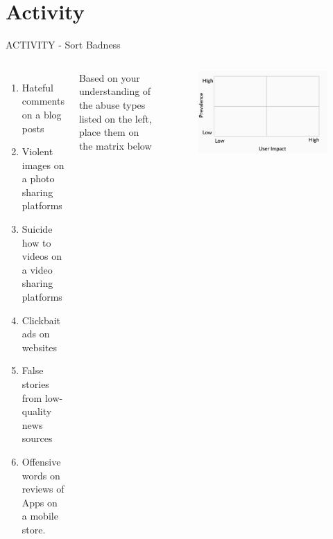 \documentclass[nobackground,dvipsnames,table,aspectratio=169]{beamer}
\begin{document}
\section{Activity}

\begin{frame}{ACTIVITY - Sort Badness}
    \begin{columns}[T]
            \begin{enumerate}
                \item Hateful comments on a blog posts
                \item Violent images on a photo sharing platforms \item Suicide how to videos on a video sharing platforms
                \item Clickbait ads on websites
                \item False stories from low-quality news sources
                \item Offensive words on reviews of Apps on a mobile store.
            \end{enumerate}
            \vspace{0.025\textheight}
            \small{Based on your understanding of the abuse types listed on the left, place them on the matrix below}
            \vspace{0.12\textheight}
            \begin{figure}
                \centering
                \includegraphics[width=\textwidth]{sort-badness}
            \end{figure}
    \end{columns}
\end{frame}
\end{document}
